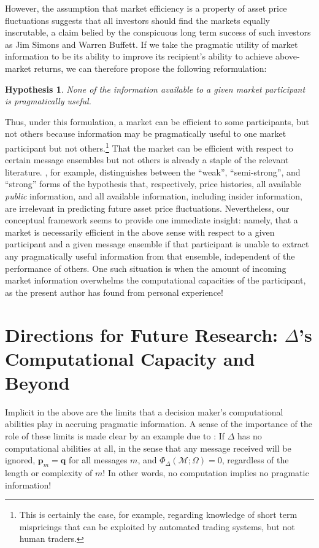 \documentclass[11pt]{article}
\newtheorem*{hypothesis}{Hypothesis}
\begin{document}
However, the assumption that market efficiency is a property of asset price fluctuations suggests that all investors
should find the markets equally inscrutable, a claim belied by the conspicuous long term success of such investors as
Jim Simons and Warren Buffett.  If we take the pragmatic utility of market information to be its ability to
improve its recipient's ability to achieve above-market returns, we can therefore propose the following reformulation:
\begin{hypothesis}
None of the information available to {\rm a given market participant} is pragmatically useful.
\end{hypothesis}

Thus, under this formulation, a market can be efficient to some participants, but not others because information may be pragmatically useful to one market participant 
but not others.\footnote{This is certainly the case, for example, regarding knowledge of short term mispricings that can be exploited by automated trading systems, but not human traders.} 
That the market can be efficient with respect to certain message ensembles but not others is already a staple of the relevant literature.  \cite{Fama}, for example, distinguishes between the ``weak'', 
``semi-strong'', and ``strong'' forms of the hypothesis that, respectively, price histories, all available 
{\it public} information, and all available information, including insider information, are irrelevant in predicting future asset price fluctuations.  Nevertheless, our conceptual framework seems to provide one immediate 
insight: namely, that a market is necessarily efficient in the above sense with respect to a given participant and a given message ensemble if that participant is unable to extract any pragmatically useful information from that ensemble, independent of the performance of others.  One such 
situation is when the amount of incoming market information overwhelms the computational capacities of the participant, as 
the present author has found from personal experience!

\section{Directions for Future Research:  $\Delta$'s Computational Capacity and Beyond}

Implicit in the above are the limits that a decision maker's computational abilities play in accruing pragmatic information.
A sense of the importance of the role of these limits is made clear by an example due to \cite{wow}:  If $\Delta$ has no computational abilities at all, in the sense that any message
received will be ignored, $\mathbf p_m = \mathbf q$ for all messages $m$, and $\Phi_{\Delta} ({\mathcal M}; \Omega) =0$, regardless of the length or complexity of $m$!  In other words, no computation implies no pragmatic information!\\
\end{document}
